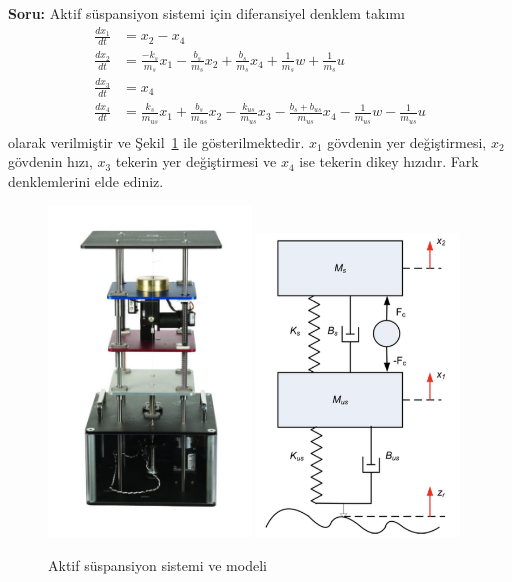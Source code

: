 \noindent\textbf{Soru:} Aktif süspansiyon sistemi için diferansiyel denklem takımı 
\begin{equation}
\begin{split}
    \frac{dx_1}{dt}&=x_2-x_4\\
    \frac{dx_2}{dt}&=\frac{-k_s}{m_s}x_1-\frac{b_s}{m_s}x_2+\frac{b_s}{m_s}x_4+\frac{1}{m_s}w+\frac{1}{m_s}u\\
    \frac{dx_3}{dt}&=x_4\\
    \frac{dx_4}{dt}&=\frac{k_s}{m_{us}}x_1+\frac{b_s}{m_{us}}x_2-\frac{k_{us}}{m_{us}}x_3-\frac{b_s+b_{us}}{m_{us}}x_4-\frac{1}{m_{us}}w-\frac{1}{m_{us}}u\\    
\end{split}
\end{equation}
olarak verilmiştir ve Şekil~\ref{fig:suspension} ile gösterilmektedir. $x_1$ gövdenin yer değiştirmesi, $x_2$ gövdenin hızı, $x_3$ tekerin yer değiştirmesi ve $x_4$ ise tekerin dikey hızıdır. Fark denklemlerini elde ediniz.
\begin{figure}[!htb]
    \centering
    \includegraphics[width=0.48\textwidth]{lab}
    \includegraphics[width=0.48\textwidth]{suspension}
    \caption{Aktif süspansiyon sistemi ve modeli}\label{fig:suspension}
\end{figure}
